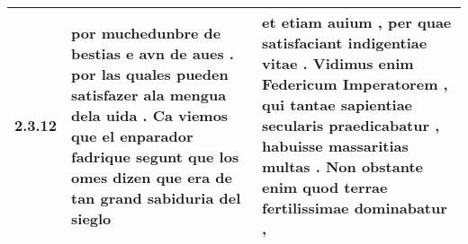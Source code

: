\begin{tabular}{|p{1cm}|p{6.5cm}|p{6.5cm}|}

\hline
2.3.12 & por muchedunbre de bestias e avn de aues . por las quales pueden satisfazer ala mengua dela uida . \textbf{ Ca viemos que el enparador fadrique } segunt que los omes dizen que era de tan grand sabiduria del sieglo & et etiam auium , per quae satisfaciant indigentiae vitae . \textbf{ Vidimus enim Federicum Imperatorem , } qui tantae sapientiae secularis praedicabatur , habuisse massaritias multas . Non obstante enim quod terrae fertilissimae dominabatur , \\\hline

\end{tabular}
